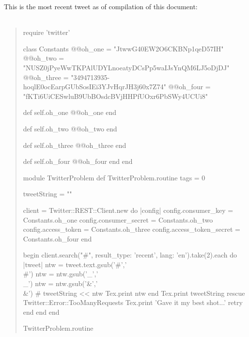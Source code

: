 \documentclass{article}
\begin{document}
This is the most recent tweet as of compilation of this document:\\\\
\begin{quote}
\begin{rbtex}
    require 'twitter'

    class Constants
    	@@oh_one = "JtwwG40EW2O6CKBNp1qeD57IH"
    	@@oh_two = "NUSZ0jPyeWwTKPAlUDYLnoeatyDCsPp5waIJsYnQM6LJ5oDjDJ"
    	@@oh_three = "3494713935-hoqlE0ocEarpGUbSosIEi3YJvHqrJH3j60x7Z74"
    	@@oh_four = "fKTi6UiCESwluB9UbBOsdcBVjHHPfUOxr6PbSWy4UCUi8"

    	def self.oh_one
    		@@oh_one
    	end

    	def self.oh_two
    		@@oh_two
    	end

    	def self.oh_three
    		@@oh_three
    	end

    	def self.oh_four
    		@@oh_four
    	end
    end

    module TwitterProblem
    	def TwitterProblem.routine
    		tags = 0

            tweetString = ""

    		client = Twitter::REST::Client.new do |config|
    		  config.consumer_key        = Constants.oh_one
    		  config.consumer_secret     = Constants.oh_two
    		  config.access_token        = Constants.oh_three
    		  config.access_token_secret = Constants.oh_four
    		end

    		begin
    			client.search("#", result_type: 'recent', lang: 'en').take(2).each do |tweet|
                    ntw = tweet.text.gsub('#','\\#')
                    ntw = ntw.gsub('_','\\_')
                    ntw = ntw.gsub('&','\\&')
                    # tweetString << ntw
                    Tex.print ntw
                end
                Tex.print tweetString
    		rescue Twitter::Error::TooManyRequests
                Tex.print 'Gave it my best shot...'
    			retry
    		end
    	end
    end

    TwitterProblem.routine
\end{rbtex}
\end{quote}
\end{document}
